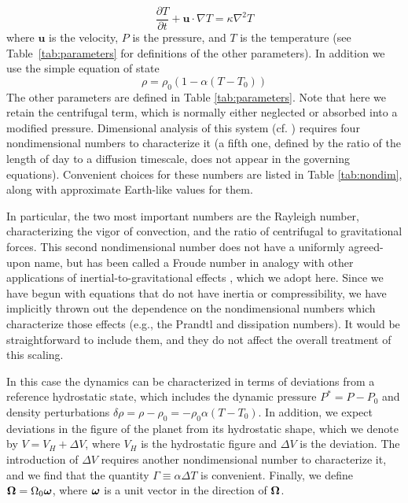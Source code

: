 \documentclass[extra,mreferee]{gji}
\begin{document}
\begin{equation}
\frac{\partial T}{\partial t} + \mathbf{u} \cdot \nabla T = \kappa \nabla^2 T
\label{eq:energy}
\end{equation}
where $\mathbf{u}$ is the velocity, $P$ is the pressure, and $T$ is the temperature
(see Table~\ref{tab:parameters} for definitions of the other parameters).
In addition we use the simple equation of state
\begin{equation}
\rho = \rho_0 \left( 1 - \alpha (T-T_0) \right)
\label{eq:eos}
\end{equation}
The other parameters are defined in Table \ref{tab:parameters}.
Note that here we retain the centrifugal term, which is normally either neglected or absorbed into a modified pressure.
Dimensional analysis of this system (cf. \citet{barenblatt1996scaling}) requires four nondimensional numbers to characterize it
(a fifth one, defined by the ratio of the length of day to a diffusion timescale, does not appear in the governing equations).
Convenient choices for these numbers are listed in Table \ref{tab:nondim}, along with approximate Earth-like values for them.

In particular, the two most important numbers are the Rayleigh number, characterizing the vigor of convection, and the ratio of centrifugal to gravitational forces.
This second nondimensional number does not have a uniformly agreed-upon name, but has been called a Froude number in analogy with other applications of inertial-to-gravitational effects \citep{mckenzie1968influence}, which we adopt here.
Since we have begun with equations that do not have inertia or compressibility, we have implicitly thrown out the dependence on the nondimensional numbers which characterize those effects (e.g., the Prandtl and dissipation numbers).
It would be straightforward to include them, and they do not affect the overall treatment of this scaling.

In this case the dynamics can be characterized in terms of deviations from a reference hydrostatic state, which includes the dynamic pressure $P^* = P - P_0$ and density perturbations $\delta \rho = \rho- \rho_0 = - \rho_0 \alpha (T-T_0)$.
In addition, we expect deviations in the figure of the planet from its hydrostatic shape, which we denote by $V = V_H + \Delta V$, where $V_H$ is the hydrostatic figure and $\Delta V$ is the deviation.
The introduction of $\Delta V$ requires another nondimensional number to characterize it, and we find that the quantity $\Gamma \equiv \alpha \Delta T$ is convenient.
Finally, we define $\mitbf{\Omega} = \Omega_0 \mitbf{\omega}$, where $\mitbf{\omega}$ is a unit vector in the direction of $\mitbf{\Omega}$.
\end{document}
